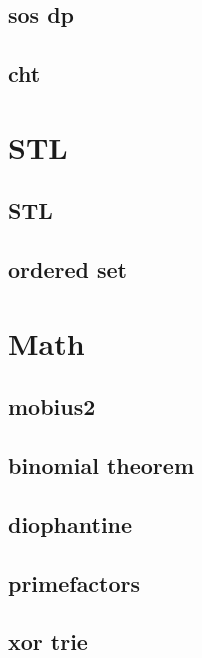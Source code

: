 \subsection{sos dp}
\raggedbottom
\hrulefill
\subsection{cht}
\raggedbottom
\hrulefill

\section{STL}
\subsection{STL}
\raggedbottom
\hrulefill
\subsection{ordered set}
\raggedbottom
\hrulefill

\section{Math}
\subsection{mobius2}
\raggedbottom
\hrulefill
\subsection{binomial theorem}
\raggedbottom
\hrulefill
\subsection{diophantine}
\raggedbottom
\hrulefill
\subsection{primefactors}
\raggedbottom
\hrulefill
\subsection{xor trie}
\raggedbottom
\hrulefill
